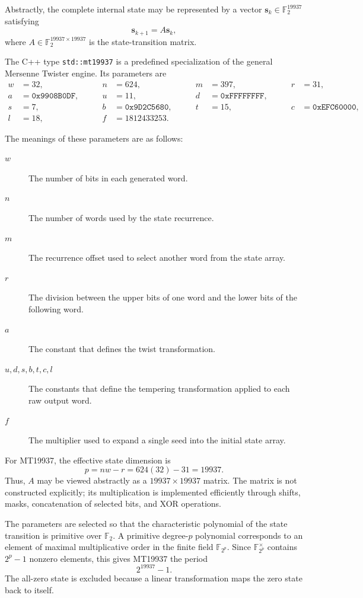 \documentclass{article}
\begin{document}
Abstractly, the complete internal state may be represented by a vector
\(\mathbf s_k \in \mathbb{F}_2^{19937}\) satisfying
\[
\mathbf s_{k+1}=A\mathbf s_k,
\]
where \(A \in \mathbb{F}_2^{19937\times19937}\) is the state-transition
matrix.

\noindent The C++ type \texttt{std::mt19937} is a predefined specialization of
the general Mersenne Twister engine. Its parameters are
\[
\begin{alignedat}{4}
w &= 32, &\qquad n &= 624, &\qquad m &= 397, &\qquad r &= 31,\\
a &= \mathtt{0x9908B0DF}, &\qquad u &= 11, &\qquad d &= \mathtt{0xFFFFFFFF},\\
s &= 7, &\qquad b &= \mathtt{0x9D2C5680}, &\qquad t &= 15, &\qquad c &= \mathtt{0xEFC60000},\\
l &= 18, &\qquad f &= 1812433253.
\end{alignedat}
\]

The meanings of these parameters are as follows:
\begin{description}
    \item[\(w\)] The number of bits in each generated word.
    \item[\(n\)] The number of words used by the state recurrence.
    \item[\(m\)] The recurrence offset used to select another word from
          the state array.
    \item[\(r\)] The division between the upper bits of one word and the
          lower bits of the following word.
    \item[\(a\)] The constant that defines the twist transformation.
    \item[\(u,d,s,b,t,c,l\)] The constants that define the tempering
          transformation applied to each raw output word.
    \item[\(f\)] The multiplier used to expand a single seed into the
          initial state array.
\end{description}

For MT19937, the effective
state dimension is
\[
p=nw-r=624(32)-31=19937.
\]
Thus, \(A\) may be viewed abstractly as a
\(19937\times19937\) matrix. The matrix is not constructed explicitly;
its multiplication is implemented efficiently through shifts, masks,
concatenation of selected bits, and XOR operations.

The parameters are selected so that the characteristic polynomial of
the state transition is primitive over \(\mathbb{F}_2\). A primitive
degree-\(p\) polynomial corresponds to an element of maximal
multiplicative order in the finite field \(\mathbb{F}_{2^p}\). Since
\(\mathbb{F}_{2^p}^{\times}\) contains \(2^p-1\) nonzero elements, this
gives MT19937 the period
\[
2^{19937}-1.
\]
The all-zero state is excluded because a linear transformation maps the
zero state back to itself.
\end{document}
